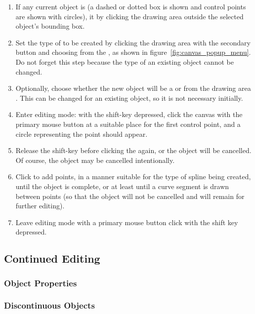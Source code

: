 			\begin{enumerate}
				\item If any current object is 
						(a dashed or dotted box is shown and
						control points are shown with circles),
						 it by clicking the
						drawing area outside the selected object's
						bounding box.
				\item Set the type of 
						to be created by clicking the
						drawing area with the secondary 
						button and choosing from the ,
						as shown in
						figure~\ref{fig:canvas_popup_menu}.
						Do not forget this step because the
						 type of an existing
						object cannot be changed.
				\item Optionally, choose whether the new object
						will be a  or 
						from the drawing area .
						This can be changed for an existing
						object, so it is not necessary initially.
				\item Enter editing mode:
						with the shift-key depressed, click the
						canvas with
						the primary mouse button at a suitable
						place for the first control point, and
						a circle representing the point should appear.
				\item Release the shift-key before clicking
						the  again, or the object
						will be cancelled. Of course, the object
						may be cancelled intentionally.
				\item Click to add points, in a manner suitable
						for the type of spline being created,
						until the object is complete, or at
						least until a curve segment is drawn between
						points (so that the object will not
						be cancelled and will remain for further
						editing).
				\item Leave editing mode with a primary
						mouse button click with the shift
						key depressed.
			\end{enumerate}


		\subsection{Continued Editing}%
		\label{ssec:cont_editing}
			\subsubsection{Object Properties}%
			\label{sssec:object_props}
			\subsubsection{Discontinuous Objects}%
			\label{sssec:discont_objects}

